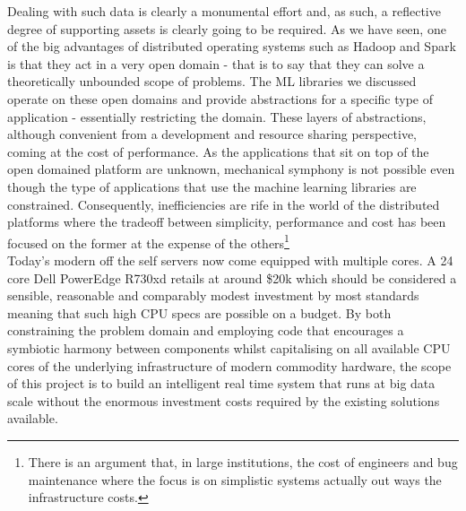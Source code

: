 \documentclass[a4paper,11pt]{scrreprt}
\begin{document}
Dealing with such data is clearly a monumental effort and, as such, a reflective degree of supporting assets is clearly going to be required. As we have seen, one of the big advantages of distributed operating systems such as Hadoop and Spark is that they act in a very open domain - that is to say that they can solve a theoretically unbounded scope of problems. The ML libraries we discussed operate on these open domains and provide abstractions for a specific type of application - essentially restricting the domain. These layers of abstractions, although convenient from a development and resource sharing perspective, coming at the cost of performance. As the applications that sit on top of the open domained platform are unknown, mechanical symphony is not possible even though the type of applications that use the machine learning libraries are constrained. Consequently, inefficiencies are rife in the world of the distributed platforms where the tradeoff between simplicity, performance and cost has been focused on the former at the expense of the others\footnote{There is an argument that, in large institutions, the cost of engineers and bug maintenance where the focus is on simplistic systems actually out ways the infrastructure costs.}\\

Today's modern off the self servers now come equipped with multiple cores. A 24 core Dell PowerEdge R730xd retails at around \$20k which should be considered a sensible, reasonable and comparably modest investment by most standards meaning that such high CPU specs are possible on a budget. By both constraining the problem domain and employing code that encourages a symbiotic harmony between components whilst capitalising on all available CPU cores of the underlying infrastructure of modern commodity hardware, the scope of this project is to build an intelligent real time system that runs at big data scale without the enormous investment costs required by the existing solutions available. 
\end{document}
